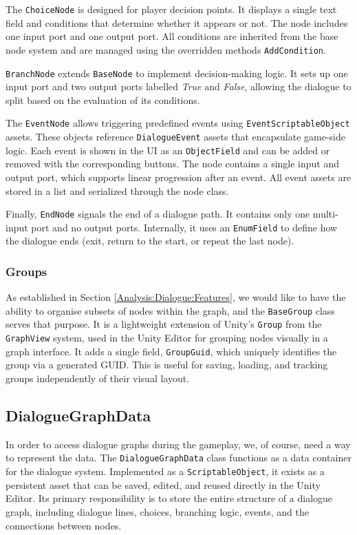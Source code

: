  The \verb|ChoiceNode| is designed for player decision points. It displays a single text field and conditions that determine whether it appears or not. The node includes one input port and one output port. All conditions are inherited from the base node system and are managed using the overridden methods \verb|AddCondition|.

\verb|BranchNode| extends \verb|BaseNode| to implement decision-making logic. It sets up one input port and two output ports labelled \textit{True} and \textit{False}, allowing the dialogue to split based on the evaluation of its conditions. 

The \verb|EventNode| allows triggering predefined events using \verb|EventScriptableObject| assets. These objects reference \verb|DialogueEvent| assets that encapsulate game-side logic. Each event is shown in the UI as an \verb|ObjectField| and can be added or removed with the corresponding buttons. The node contains a single input and output port, which supports linear progression after an event. All event assets are stored in a list and serialized through the node class.

Finally, \verb|EndNode| signals the end of a dialogue path. It contains only one multi-input port and no output ports. Internally, it uses an \verb|EnumField| to define how the dialogue ends (exit, return to the start, or repeat the last node). 
 

\subsubsection{Groups}
As established in Section \ref{Analysis:Dialogue:Features}, we would like to have the ability to organise subsets of nodes within the graph, and the \verb|BaseGroup| class serves that purpose. It is a lightweight extension of Unity’s \verb|Group| from the \verb|GraphView| system, used in the Unity Editor for grouping nodes visually in a graph interface. It adds a single field, \verb|GroupGuid|, which uniquely identifies the group via a generated GUID. This is useful for saving, loading, and tracking groups independently of their visual layout.


\subsection{DialogueGraphData}
In order to access dialogue graphs during the gameplay, we, of course, need a way to represent the data. The \verb|DialogueGraphData| class functions as a data container for the dialogue system. Implemented as a \verb|ScriptableObject|, it exists as a persistent asset that can be saved, edited, and reused directly in the Unity Editor. Its primary responsibility is to store the entire structure of a dialogue graph, including dialogue lines, choices, branching logic, events, and the connections between nodes.


